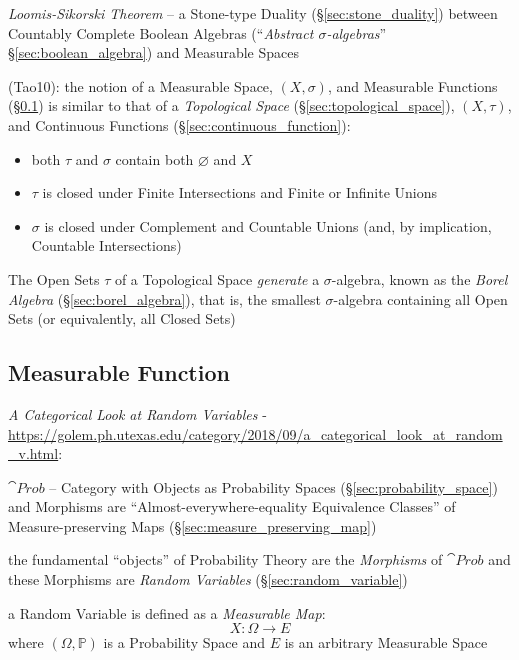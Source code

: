 \emph{Loomis-Sikorski Theorem} -- a Stone-type Duality
(\S\ref{sec:stone_duality}) between Countably Complete Boolean Algebras
(``\emph{Abstract $\sigma$-algebras}'' \S\ref{sec:boolean_algebra}) and
Measurable Spaces

(Tao10): the notion of a Measurable Space, $(X,\sigma)$, and Measurable
Functions (\S\ref{sec:measurable_function}) is similar to that of a
\emph{Topological Space} (\S\ref{sec:topological_space}), $(X,\tau)$, and
Continuous Functions (\S\ref{sec:continuous_function}):
\begin{itemize}
  \item both $\tau$ and $\sigma$ contain both $\varnothing$ and $X$
  \item $\tau$ is closed under Finite Intersections and Finite or Infinite
    Unions
  \item $\sigma$ is closed under Complement and Countable Unions (and,
    by implication, Countable Intersections)
\end{itemize}
The Open Sets $\tau$ of a Topological Space \emph{generate} a $\sigma$-algebra,
known as the \emph{Borel Algebra} (\S\ref{sec:borel_algebra}), that is, the
smallest $\sigma$-algebra containing all Open Sets (or equivalently, all Closed
Sets)



\subsection{Measurable Function}\label{sec:measurable_function}

\emph{A Categorical Look at Random Variables} -
\url{https://golem.ph.utexas.edu/category/2018/09/a_categorical_look_at_random_v.html}:

$\cat{Prob}$ -- Category with Objects as Probability Spaces
(\S\ref{sec:probability_space}) and Morphisms are ``Almost-everywhere-equality
Equivalence Classes'' of Measure-preserving Maps
(\S\ref{sec:measure_preserving_map})

the fundamental ``objects'' of Probability Theory are the \emph{Morphisms} of
$\cat{Prob}$ and these Morphisms are \emph{Random Variables}
(\S\ref{sec:random_variable})

a Random Variable is defined as a \emph{Measurable Map}:
\[
  X : \Omega \rightarrow E
\]
where $(\Omega,\mathbb{P})$ is a Probability Space and $E$ is an arbitrary
Measurable Space




